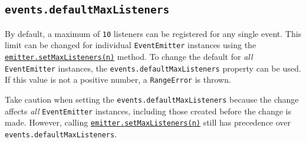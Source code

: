 \begin{Shaded}
\begin{Highlighting}[]
\NormalTok{ \{ }\OperatorTok{,}\OperatorTok{=} \NormalTok{(}\NormalTok{)}\OperatorTok{;}

 \NormalTok{ \{}
  \NormalTok{() \{}
    \NormalTok{(\{ }\OperatorTok{:} \NormalTok{ \})}\OperatorTok{;}
\NormalTok{  \}}

\OperatorTok{,} \OperatorTok{,} 
    \NormalTok{(}\OperatorTok{,} \OperatorTok{,} \OperatorTok{,}\OperatorTok{,} \OperatorTok{;}
    \OperatorTok{;}
\NormalTok{  \}}

\NormalTok{  \}}
\NormalTok{\}}
\end{Highlighting}
\end{Shaded}

\subsection{\texorpdfstring{\texttt{events.defaultMaxListeners}}{events.defaultMaxListeners}}\label{events.defaultmaxlisteners}

By default, a maximum of \texttt{10} listeners can be registered for any
single event. This limit can be changed for individual
\texttt{EventEmitter} instances using the
\hyperref[emittersetmaxlistenersn]{\texttt{emitter.setMaxListeners(n)}}
method. To change the default for \emph{all} \texttt{EventEmitter}
instances, the \texttt{events.defaultMaxListeners} property can be used.
If this value is not a positive number, a \texttt{RangeError} is thrown.

Take caution when setting the \texttt{events.defaultMaxListeners}
because the change affects \emph{all} \texttt{EventEmitter} instances,
including those created before the change is made. However, calling
\hyperref[emittersetmaxlistenersn]{\texttt{emitter.setMaxListeners(n)}}
still has precedence over \texttt{events.defaultMaxListeners}.

